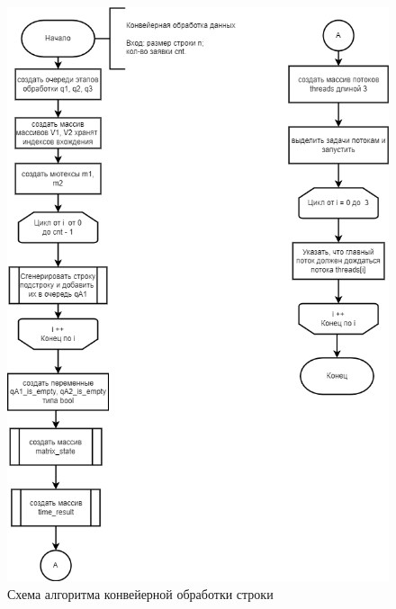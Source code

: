 \clearpage

\begin{figure}[h]
	\centering
	\includegraphics[scale=0.6]{img/parallel_processing.png}
	\caption{Схема алгоритма конвейерной обработки строки}
	\label{fig:parallel_processing}
\end{figure}

\clearpage

